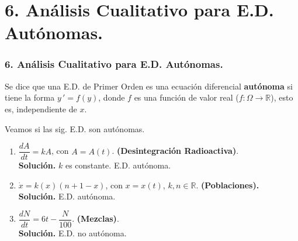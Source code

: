 \documentclass{beamer}
\begin{document}

\section{6. Análisis Cualitativo para E.D. Autónomas.} %

\begin{frame}[t]
	\frametitle{6. Análisis Cualitativo para E.D. Autónomas.}
	\vspace{-2mm}
	\begin{definition}
		Se dice que una E.D. de Primer Orden es una ecuación diferencial \textbf{autónoma} si tiene la forma \(y\,' =f(y)\), donde \(f\) es una función de valor real (\(f: \Omega \longrightarrow \mathbb{R}\)), esto es, independiente de \(x\).
	\end{definition}
	\vspace{-2mm}
	\begin{example}
		Veamos si las sig. E.D. son autónomas.
		\begin{enumerate}
			\item \(\dfrac{dA}{dt} = kA\), con \(A=A(t)\). \textbf{(Desintegración Radioactiva)}.\\
				\textbf{Solución.} \(k\) es constante. E.D. autónoma.
			\item \(\dot{x} =k(x) (n+1-x)\), con \(x=x(t)\), \(k,n \in \mathbb{R}\). \textbf{(Poblaciones).}\\
				\textbf{Solución.} E.D. autónoma.
			\item \(\dfrac{dN}{dt} = 6t - \dfrac{N}{100}\). \textbf{(Mezclas)}.\\
				\textbf{Solución.} E.D. no autónoma.
		\end{enumerate}
	\end{example}
\end{frame}
\end{document}
